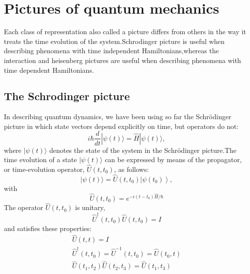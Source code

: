 \section{Pictures of quantum mechanics}
Each class of representation also called a picture differs from others in the way it treats the time evolution of the system.Schrodinger picture is useful when describing phenomena with time independent Hamiltonians,whereas the interaction and heisenberg pictures are useful when describing phenomena with time dependent Hamiltonians.
\subsection{The Schrodinger picture}
In describing quantum dynamics, we have been using so far the Schrödinger picture in which state vectors depend explicitly on time, but operators do not:
$$
i \hbar \frac{d}{d t}|\psi(t)\rangle=\hat{H}|\psi(t)\rangle,
$$
where $|\psi(t)\rangle$ denotes the state of the system in the Schrödinger picture.The  time evolution of a state $|\psi(t)\rangle$ can be expressed by means of the propagator, or time-evolution operator, $\hat{U}\left(t, t_{0}\right)$, as follows:
$$
|\psi(t)\rangle=\hat{U}\left(t, t_{0}\right)\left|\psi\left(t_{0}\right)\right\rangle,
$$
with
$$
\hat{U}\left(t, t_{0}\right)=e^{-i\left(t-t_{0}\right) \hat{H} / \hbar}
$$
The operator $\hat{U}\left(t, t_{0}\right)$ is unitary,
$$
\hat{U}^{\dagger}\left(t, t_{0}\right) \hat{U}\left(t, t_{0}\right)=I
$$
and satisfies these properties:
$$
\begin{gathered}
\hat{U}(t, t)=I \\
\hat{U}^{\dagger}\left(t, t_{0}\right)=\hat{U}^{-1}\left(t, t_{0}\right)=\hat{U}\left(t_{0}, t\right) \\
\hat{U}\left(t_{1}, t_{2}\right) \hat{U}\left(t_{2}, t_{3}\right)=\hat{U}\left(t_{1}, t_{3}\right)
\end{gathered}
$$
